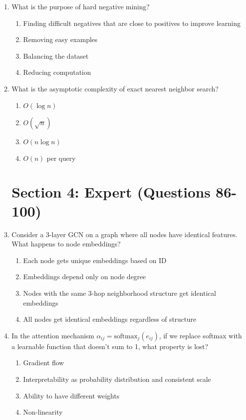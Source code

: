 \documentclass[12pt,a4paper]{article}
\begin{document}
\begin{enumerate}
\item What is the purpose of hard negative mining?
\begin{enumerate}[label=\Alph*)]
    \item Finding difficult negatives that are close to positives to improve learning
    \item Removing easy examples
    \item Balancing the dataset
    \item Reducing computation
\end{enumerate}

\item What is the asymptotic complexity of exact nearest neighbor search?
\begin{enumerate}[label=\Alph*)]
    \item $O(\log n)$
    \item $O(\sqrt{n})$
    \item $O(n \log n)$
    \item $O(n)$ per query
\end{enumerate}

\newpage
\section*{\textcolor{hard}{Section 4: Expert (Questions 86-100)}}

\item Consider a 3-layer GCN on a graph where all nodes have identical features. What happens to node embeddings?
\begin{enumerate}[label=\Alph*)]
    \item Each node gets unique embeddings based on ID
    \item Embeddings depend only on node degree
    \item Nodes with the same 3-hop neighborhood structure get identical embeddings
    \item All nodes get identical embeddings regardless of structure
\end{enumerate}

\item In the attention mechanism $\alpha_{ij} = \text{softmax}_j(e_{ij})$, if we replace softmax with a learnable function that doesn't sum to 1, what property is lost?
\begin{enumerate}[label=\Alph*)]
    \item Gradient flow
    \item Interpretability as probability distribution and consistent scale
    \item Ability to have different weights
    \item Non-linearity
\end{enumerate}


\end{enumerate}
\end{document}
